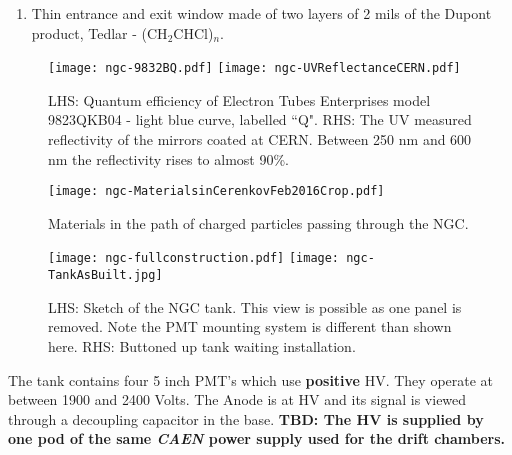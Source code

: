 {\begin{enumerate}
 The PMTs are model 9823QKB04 and tubes with serial numbers 16747,
 16777, 16787 and 16785 are installed to accept light from the mirrors
 in position Top Right, Top Left, Bottom Right and Bottom Left
 respectively while looking along increasing $z$. The tubes are
 surrounded by a mu-metal shield and the HV is distributed to the
 stages by a positive base.
\item Thin entrance and exit window made of two layers of 2 mils of
  the Dupont product, Tedlar - (CH$_2$CHCl)$_n$.
\end{enumerate}
\begin{figure}[!h] %
   \centering
   \texttt{[image: ngc-9832BQ.pdf]}
   \texttt{[image: ngc-UVReflectanceCERN.pdf]}
   \caption{LHS:
     Quantum efficiency of Electron Tubes Enterprises model 9823QKB04
     - light blue curve, labelled ``Q". RHS: The UV measured
     reflectivity of the mirrors coated at CERN. Between 250 nm and
     600 nm the reflectivity rises to almost
     90\%. \label{fig:tubeandmirror}}

\end{figure}
\begin{figure}[!h] %
   \centering
   \texttt{[image: ngc-MaterialsinCerenkovFeb2016Crop.pdf]}
   \caption{Materials
     in the path of charged particles passing through the
     NGC.\label{fig:materials}}
\end{figure}



\begin{figure}[!h] %
   \centering
   \texttt{[image: ngc-fullconstruction.pdf]}
   \texttt{[image: ngc-TankAsBuilt.jpg]}
   \caption{LHS: Sketch of the NGC tank. This view is possible as one
     panel is removed. Note the PMT mounting system is different than
     shown here.  RHS: Buttoned up tank waiting
     installation.\label{fig:Box}}

\end{figure}


The tank contains four 5 inch PMT's which use {\bf positive} HV. They
operate at between 1900 and 2400 Volts. The Anode is at HV and its
signal is viewed through a decoupling capacitor in the base. {\bf TBD:
  The HV is supplied by one pod of the same {\em CAEN} power supply
  used for the drift chambers.}

}
